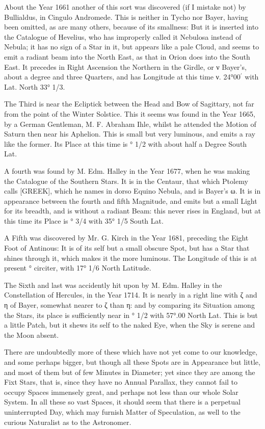 \documentclass[a4paper, 12pt, oneside, polutonikogreek, english]{article}
\begin{document}
About the Year 1661 another of this sort was discovered (if I mistake not) by Bullialdus, in Cingulo Andromede. This is neither in Tycho nor Bayer, having been omitted, as are many others, because of its smallness: But it is inserted into the Catalogue of Hevelius, who has improperly called it Nebulosa instead of Nebula; it has no sign of a Star in it, but appears like a pale Cloud, and seems to emit a radiant beam into the North East, as that in Orion does into the South East. It precedes in Right Ascension the Northern in the Girdle, or ν Bayer's, about a degree and three Quarters, and has Longitude at this time ν. 24°00$^{\prime}$ with Lat. North 33° 1/3.

The Third is near the Ecliptick between the Head and Bow of Sagittary, not far from the point of the Winter Solstice. This it seems was found in the Year 1665, by a German Gentleman, M. F. Abraham Ihle, whilst he attended the Motion of Saturn then near his Aphelion. This is small but very luminous, and emits a ray like the former. Its Place at this time is ° 1/2 with about half a Degree South Lat.

A fourth was found by M. Edm. Halley in the Year 1677, when he was making the Catalogue of the Southern Stars. It is in the Centaur, that which Ptolemy calls [GREEK], which he names in dorso Equino Nebula, and is Bayer's ω. It is in appearance between the fourth and fifth Magnitude, and emits but a small Light for its breadth, and is without a radiant Beam: this never rises in England, but at this time its Place is ° 3/4 with 35° 1/5 South Lat.

A Fifth was discovered by Mr. G. Kirch in the Year 1681, preceding the Eight Foot of Antinous: It is of its self but a small obscure Spot, but has a Star that shines through it, which makes it the more luminous. The Longitude of this is at present ° circiter, with 17° 1/6 North Latitude.

The Sixth and last was accidently hit upon by M. Edm. Halley in the Constellation of Hercules, in the Year 1714. It is nearly in a right line with ζ and η of Bayer, somewhat nearer to ζ than η: and by comparing its Situation among the Stars, its place is sufficiently near in ° 1/2 with 57°.00 North Lat. This is but a little Patch, but it shews its self to the naked Eye, when the Sky is serene and the Moon absent.

There are undoubtedly more of these which have not yet come to our knowledge, and some perhaps bigger, but though all these Spots are in Appearance but little, and most of them but of few Minutes in Diameter; yet since they are among the Fixt Stars, that is, since they have no Annual Parallax, they cannot fail to occupy Spaces immensely great, and perhaps not less than our whole Solar System. In all these so vast Spaces, it should seem that there is a perpetual uninterrupted Day, which may furnish Matter of Speculation, as well to the curious Naturalist as to the Astronomer.
\end{document}
